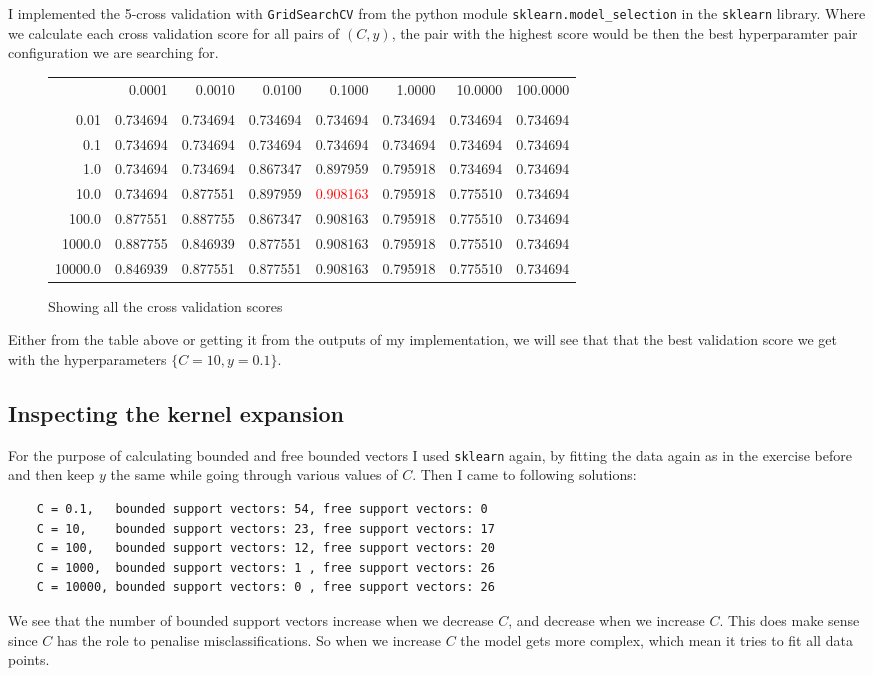 I implemented the 5-cross validation with \texttt{GridSearchCV} from the python module \texttt{sklearn.model\_selection} in the \texttt{sklearn} library.
Where we calculate each cross validation score for all pairs of $(C,y)$, the pair with the highest score would be then the best hyperparamter pair configuration we are searching for.

\newpage
\begin{figure}[!htpb]
\begin{tabular}{rrrrrrrr}
\toprule
  & 0.0001   &  0.0010   &  0.0100   &  0.1000   &  1.0000   &  10.0000  &  100.0000 \\
  &         &           &           &           &           &           &           \\
\midrule
 0.01 & 0.734694 &  0.734694 &  0.734694 &  0.734694 &  0.734694 &  0.734694 &  0.734694 \\
 0.1 & 0.734694 &  0.734694 &  0.734694 &  0.734694 &  0.734694 &  0.734694 &  0.734694 \\
 1.0 & 0.734694 &  0.734694 &  0.867347 &  0.897959 &  0.795918 &  0.734694 &  0.734694 \\
 10.0 & 0.734694 &  0.877551 &  0.897959 &  \textcolor{red}{0.908163} &  0.795918 &  0.775510 &  0.734694 \\
 100.0 & 0.877551 &  0.887755 &  0.867347 &  0.908163 &  0.795918 &  0.775510 &  0.734694 \\
 1000.0 & 0.887755 &  0.846939 &  0.877551 &  0.908163 &  0.795918 &  0.775510 &  0.734694 \\
 10000.0 & 0.846939 &  0.877551 &  0.877551 &  0.908163 &  0.795918 &  0.775510 &  0.734694 \\
\bottomrule
\end{tabular}
\caption{Showing all the cross validation scores}
\end{figure}


Either from the table above or getting it from the outputs of my implementation, we will see that that the best validation score we get with the hyperparameters $\{C=10,y=0.1\}$.

\subsection{Inspecting the kernel expansion}
For the purpose of calculating bounded and free bounded vectors I used \texttt{sklearn} again, by fitting the data again as in the exercise before and then keep $y$ the same while going through various values of $C$.
Then I came to following solutions:
\begin{verbatim}
	C = 0.1,   bounded support vectors: 54, free support vectors: 0
	C = 10,    bounded support vectors: 23, free support vectors: 17
	C = 100,   bounded support vectors: 12, free support vectors: 20
	C = 1000,  bounded support vectors: 1 , free support vectors: 26
	C = 10000, bounded support vectors: 0 , free support vectors: 26 
\end{verbatim}
We see that the number of bounded support vectors increase when we decrease $C$, and decrease when we increase $C$. 
This does make sense since $C$ has the role to penalise misclassifications. So when we increase $C$ the model gets more complex, which mean it tries to fit all data points.



